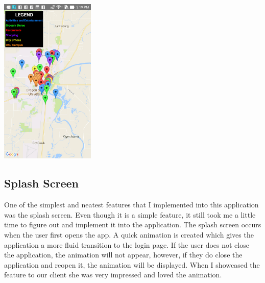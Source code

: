 \documentclass[onecolumn, draftclsnofoot,10pt, compsoc]{IEEEtran}
\begin{document}
		\includegraphics[height=8cm]{resourcemap}

	\subsection{Splash Screen}
		One of the simplest and neatest features that I implemented into this application was the splash screen. Even though it is a simple feature, it still took me a little time to figure out and implement it into the application. The splash screen occurs when the user first opens the app. A quick animation is created which gives the application a more fluid transition to the login page. If the user does not close the application, the animation will not appear, however, if they do close the application and reopen it, the animation will be displayed. When I showcased the feature to our client she was very impressed and loved the animation.

\end{document}
